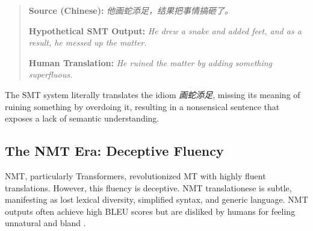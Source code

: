 \documentclass[11pt,a4paper]{article}
\begin{document}
\begin{quote}
\textbf{Source (Chinese):} \textit{他画蛇添足，结果把事情搞砸了。}

\textbf{Hypothetical SMT Output:} \textit{He drew a snake and added feet, and as a result, he messed up the matter.}

\textbf{Human Translation:} \textit{He ruined the matter by adding something superfluous.}
\end{quote}

The SMT system literally translates the idiom \textit{画蛇添足}, missing its meaning of ruining something by overdoing it, resulting in a nonsensical sentence that exposes a lack of semantic understanding.

\subsection{The NMT Era: Deceptive Fluency}

NMT, particularly Transformers, revolutionized MT with highly fluent translations. However, this fluency is deceptive. NMT translationese is subtle, manifesting as lost lexical diversity, simplified syntax, and generic language. NMT outputs often achieve high BLEU scores but are disliked by humans for feeling unnatural and bland \cite{riley2020translationese}.
\end{document}
